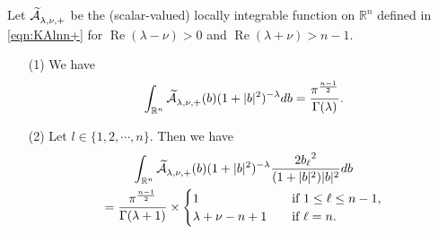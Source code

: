 \begin{lemma}
\label{lem:1616116}
Let $\widetilde{{\mathcal{A}}}_{{\lambda},{\nu},{+}}^{{}}$ be the 
 (scalar-valued) locally integrable function on ${\mathbb{R}}^n$
 defined in \eqref{eqn:KAlnn+}
 for $\operatorname{Re}\left(\lambda-\nu\right)>0$
 and $\operatorname{Re}\left(\lambda+\nu\right)>n-1$.  
\begin{enumerate}
\item[{\rm{(1)}}]
We have 
\[
   \int_{{\mathbb{R}}^n} \widetilde{{\mathcal{A}}}_{{\lambda},{\nu},{+}}^{{}}(b)
                         (1+|b|^2)^{-\lambda} d b
  =
  \frac{\pi^{\frac{n-1}{2}}}{\Gamma(\lambda)}.  
\]
\item[{\rm{(2)}}]
Let $l \in \{1,2,\cdots,n\}$.  
Then we have 
\begin{multline*}
\int_{{\mathbb{R}}^n} \widetilde{{\mathcal{A}}}_{{\lambda},{\nu},{+}}^{{}}(b)
                         (1+|b|^2)^{-\lambda} 
                       \frac{2 {b_{\ell}}^2}{(1+|b|^2)|b|^2} d b
\\
  =
\frac{\pi^{\frac{n-1}{2}}}{\Gamma(\lambda+1)}
\times
\begin{cases}
  1
\quad
&\text{if $1\le \ell \le n-1$}, 
\\
\lambda + \nu -n+1
\quad
&\text{if $\ell=n$}.  
\end{cases}
\end{multline*}
\end{enumerate}
\end{lemma}


